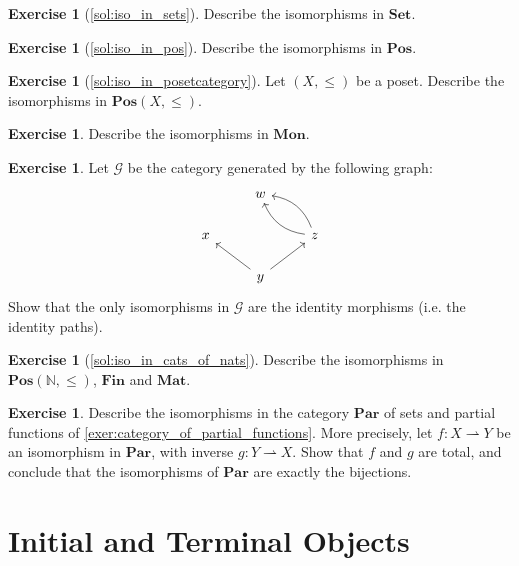 \documentclass[a4paper,11pt, oneside,titlepage=false]{scrbook}
\theoremstyle{plain}
\theoremstyle{definition}
\newtheorem{exer}[thm]{Exercise}
\newcommand{\Catb}[1]{\mathbf{#1}}
\newcommand{\SET}{\Catb{Set}}
\newcommand{\POS}{\Catb{Pos}}
\newcommand{\MON}{\Catb{Mon}}
\newcommand{\MAT}{\Catb{Mat}}
\newcommand{\SKELFINSET}{\Catb{Fin}}
\newcommand{\PAR}{\Catb{Par}}
\newcommand{\NN}{\ensuremath{\mathbb{N}}}
\begin{document}
\begin{exer}[\cref{sol:iso_in_sets}]\label{exer:iso_in_sets}
  Describe the isomorphisms in $\SET$.
\end{exer}

\begin{exer}[\cref{sol:iso_in_pos}]\label{exer:iso_in_pos}
  Describe the isomorphisms in $\POS$.
\end{exer}

\begin{exer}[\cref{sol:iso_in_posetcategory}]\label{exer:iso_in_posetcategory}
  Let $(X,\leq)$ be a poset.
  Describe the isomorphisms in $\POS(X,\leq)$.
\end{exer}

\begin{exer}
  Describe the isomorphisms in $\MON$.
\end{exer}

\begin{exer} Let $\mathcal{G}$ be the category generated by the following graph:
\[
\begin{tikzcd}
& w & \\
x & & z \arrow[lu, bend left] \arrow[lu,bend right] \\
& y \arrow[lu] \arrow[ru] &
\end{tikzcd}
\]
Show that the only isomorphisms in $\mathcal{G}$ are the identity morphisms (i.e. the identity paths).
\end{exer}

\begin{exer}[\cref{sol:iso_in_cats_of_nats}] \label{exer:iso_in_cats_of_nats}
  Describe the isomorphisms in $\POS(\NN,\leq)$, $\SKELFINSET$ and $\MAT$.
\end{exer}

\begin{exer}\label{exer:iso_in_par}
  Describe the isomorphisms in the category $\PAR$ of sets and partial functions
  of \cref{exer:category_of_partial_functions}.
  More precisely, let $f : X \rightharpoonup Y$ be an isomorphism in $\PAR$, with
  inverse $g : Y \rightharpoonup X$.
  Show that $f$ and $g$ are total, and conclude that the isomorphisms of $\PAR$
  are exactly the bijections.
\end{exer}

\chapter{Initial and Terminal Objects}\label{sec:initial-terminal}
\end{document}
